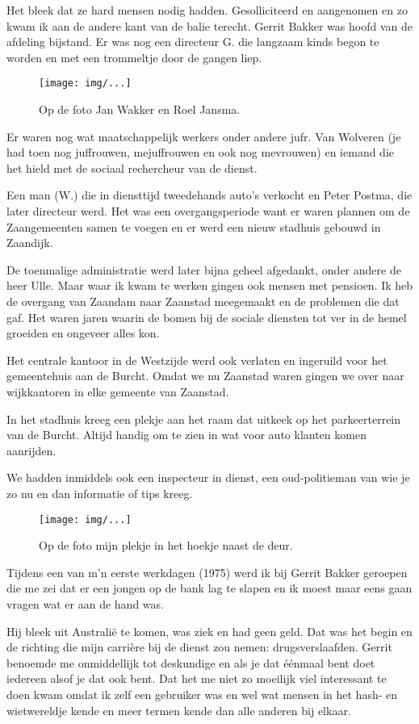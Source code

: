 \documentclass[10pt,twoside,openright]{memoir}
\begin{document}
Het bleek dat ze hard mensen nodig hadden. Gesolliciteerd en aangenomen en zo kwam ik aan de andere kant van de balie terecht. Gerrit Bakker was hoofd van de afdeling bijstand. Er was nog een directeur G. die langzaam kinds begon te worden en met een trommeltje door de gangen liep. 

\begin{figure}[t]
\texttt{[image: img/...]}
\caption{Op de foto Jan Wakker en Roel Jansma.}
\end{figure}

Er waren nog wat maatschappelijk werkers onder andere jufr. Van Wolveren (je had toen nog juffrouwen, mejuffrouwen en ook nog mevrouwen) en iemand die het hield met de sociaal rechercheur van de dienst. 

Een man (W.) die in diensttijd tweedehands auto’s verkocht en Peter Postma, die later directeur werd. Het was een overgangsperiode want er waren plannen om de Zaangemeenten samen te voegen en er werd een nieuw stadhuis gebouwd in Zaandijk. 

De toenmalige administratie werd later bijna geheel afgedankt, onder andere de heer Ulle. Maar waar ik kwam te werken gingen ook mensen met pensioen. Ik heb de overgang van Zaandam naar Zaanstad meegemaakt en de problemen die dat gaf. Het waren jaren waarin de bomen bij de sociale diensten tot ver in de hemel groeiden en ongeveer alles kon.

Het centrale kantoor in de Westzijde werd ook verlaten en ingeruild voor het gemeentehuis aan de Burcht. Omdat we nu Zaanstad waren gingen we over naar wijkkantoren in elke gemeente van Zaanstad. 

In het stadhuis kreeg een plekje aan het raam dat uitkeek op het parkeerterrein van de Burcht. Altijd handig om te zien in wat voor auto klanten komen aanrijden. 

We hadden inmiddels ook een inspecteur in dienst, een oud-politieman van wie je zo nu en dan informatie of tips kreeg. 

\begin{figure}[t]
\texttt{[image: img/...]}
\caption{Op de foto mijn plekje in het hoekje naast de deur.}
\end{figure}

Tijdens een van m’n eerste werkdagen (1975) werd ik bij Gerrit Bakker geroepen die me zei dat er een jongen op de bank lag te slapen en ik moest maar eens gaan vragen wat er aan de hand was. 

Hij bleek uit Australië te komen, was ziek en had geen geld. Dat was het begin en de richting die mijn carrière bij de dienst zou nemen: drugsverslaafden. Gerrit benoemde me onmiddellijk tot deskundige en als je dat éénmaal bent doet iedereen alsof je dat ook bent. Dat het me niet zo moeilijk viel interessant te doen kwam omdat ik zelf een gebruiker was en wel wat mensen in het hash- en wietwereldje kende en meer termen kende dan alle anderen bij elkaar. 
\end{document}

